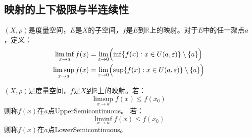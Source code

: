 \subsection{映射的上下极限与半连续性}
\begin{definition}
	$(X,\rho)$是度量空间，$E$是$X$的子空间，$f$是$E$到$\mathbb{R}$上的映射。对于$E$中的任一聚点$a$，定义：
	\begin{gather*}
		\liminf_{x\to a}f(x)=\lim_{\varepsilon\to0}\Bigl(\inf\{f(x):x\in U(a,\varepsilon)\}\setminus\{a\}\Bigr) \\
		\limsup_{x\to a}f(x)=\lim_{\varepsilon\to0}\Bigl(\sup\{f(x):x\in U(a,\varepsilon)\}\setminus\{a\}\Bigr)
	\end{gather*}
\end{definition}
\begin{definition}
	$(X,\rho)$是度量空间，$f$是$X$到$\overline{\mathbb{R}}$上的映射。若：
	\begin{equation*}
		\limsup_{x\to a}f(x)\leqslant f(x_0)
	\end{equation*}
	则称$f(x)$在$a$点\gls{UpperSemicontinuous}。
	若：
	\begin{equation*}
		\liminf_{x\to a}f(x)\leqslant f(x_0)
	\end{equation*}
	则称$f(x)$在$a$点\gls{LowerSemicontinuous}。
\end{definition}

